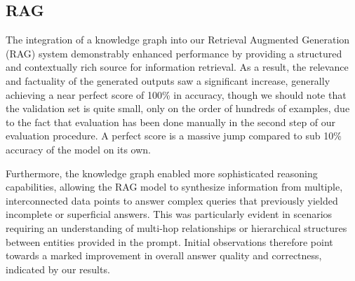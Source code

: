 \documentclass[fleqn,moreauthors,10pt]{ds_report}
\begin{document}
\subsection*{RAG}

The integration of a knowledge graph into our Retrieval Augmented Generation (RAG) system demonstrably enhanced performance by providing a structured and contextually rich source for information retrieval. As a result, the relevance and factuality of the generated outputs saw a significant increase, generally achieving a near perfect score of 100\% in accuracy, though we should note that the validation set is quite small, only on the order of hundreds of examples, due to the fact that evaluation has been done manually in the second step of our evaluation procedure. A perfect score is a massive jump compared to sub 10\% accuracy of the model on its own.

Furthermore, the knowledge graph enabled more sophisticated reasoning capabilities, allowing the RAG model to synthesize information from multiple, interconnected data points to answer complex queries that previously yielded incomplete or superficial answers. This was particularly evident in scenarios requiring an understanding of multi-hop relationships or hierarchical structures between entities provided in the prompt. Initial observations therefore point towards a marked improvement in overall answer quality and correctness, indicated by our results.



\end{document}
